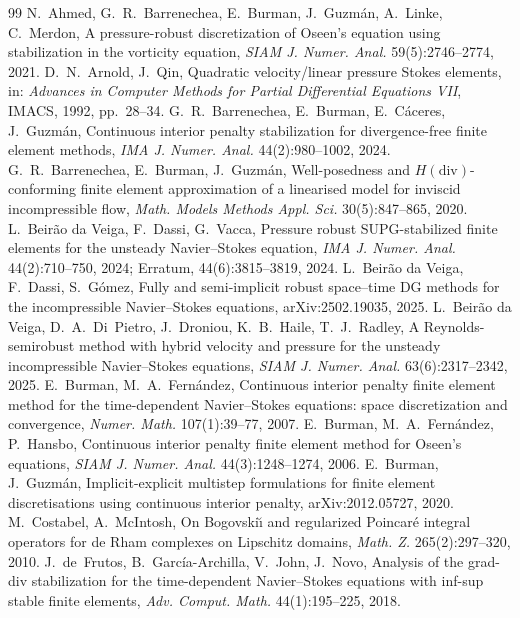 \documentclass[11pt]{article}
\theoremstyle{remark}\newtheorem{remark}{Remark}
\theoremstyle{plain}
\begin{document}
\begin{thebibliography}{99}\small
{} N.~Ahmed, G.~R.~Barrenechea, E.~Burman, J.~Guzm\'an, A.~Linke, C.~Merdon, A pressure-robust discretization of Oseen's equation using stabilization in the vorticity equation, \emph{SIAM J. Numer. Anal.} 59(5):2746--2774, 2021.
 D.~N.~Arnold, J.~Qin, Quadratic velocity/linear pressure Stokes elements, in: \emph{Advances in Computer Methods for Partial Differential Equations VII}, IMACS, 1992, pp.~28--34.
 G.~R.~Barrenechea, E.~Burman, E.~C\'aceres, J.~Guzm\'an, Continuous interior penalty stabilization for divergence-free finite element methods, \emph{IMA J. Numer. Anal.} 44(2):980--1002, 2024.
 G.~R.~Barrenechea, E.~Burman, J.~Guzm\'an, Well-posedness and $H(\mathrm{div})$-conforming finite element approximation of a linearised model for inviscid incompressible flow, \emph{Math. Models Methods Appl. Sci.} 30(5):847--865, 2020.
 L.~Beir\~ao da Veiga, F.~Dassi, G.~Vacca, Pressure robust SUPG-stabilized finite elements for the unsteady Navier--Stokes equation, \emph{IMA J. Numer. Anal.} 44(2):710--750, 2024; Erratum, 44(6):3815--3819, 2024.
 L.~Beir\~ao da Veiga, F.~Dassi, S.~G\'omez, Fully and semi-implicit robust space--time DG methods for the incompressible Navier--Stokes equations, arXiv:2502.19035, 2025.
 L.~Beir\~ao da Veiga, D.~A.~Di~Pietro, J.~Droniou, K.~B.~Haile, T.~J.~Radley, A Reynolds-semirobust method with hybrid velocity and pressure for the unsteady incompressible Navier--Stokes equations, \emph{SIAM J. Numer. Anal.} 63(6):2317--2342, 2025.
 E.~Burman, M.~A.~Fern\'andez, Continuous interior penalty finite element method for the time-dependent Navier--Stokes equations: space discretization and convergence, \emph{Numer. Math.} 107(1):39--77, 2007.
 E.~Burman, M.~A.~Fern\'andez, P.~Hansbo, Continuous interior penalty finite element method for Oseen's equations, \emph{SIAM J. Numer. Anal.} 44(3):1248--1274, 2006.
 E.~Burman, J.~Guzm\'an, Implicit-explicit multistep formulations for finite element discretisations using continuous interior penalty, arXiv:2012.05727, 2020.
 M.~Costabel, A.~McIntosh, On Bogovski\u{\i} and regularized Poincar\'e integral operators for de Rham complexes on Lipschitz domains, \emph{Math. Z.} 265(2):297--320, 2010.
 J.~de~Frutos, B.~Garc\'ia-Archilla, V.~John, J.~Novo, Analysis of the grad-div stabilization for the time-dependent Navier--Stokes equations with inf-sup stable finite elements, \emph{Adv. Comput. Math.} 44(1):195--225, 2018.

\end{thebibliography}
\end{document}
